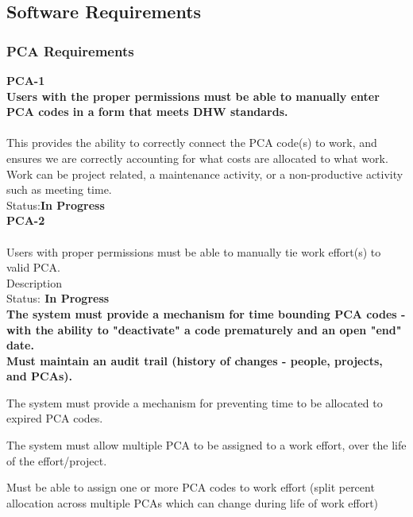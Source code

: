 \subsection{Software Requirements}

\subsubsection{PCA Requirements}

\bf{PCA-1} \\
Users with the proper permissions must be able to manually enter PCA codes in a form that meets DHW standards.\\
\paragraph{}
This provides the ability to correctly connect the PCA code(s) to work, and ensures we are correctly accounting for what costs are allocated to what work. Work can be project related, a maintenance activity, or a non-productive activity such as meeting time.\\
Status:\bfseries{In Progress}\\

\bfseries{PCA-2}\\
\paragraph{}
Users with proper permissions must be able to manually tie work effort(s) to valid PCA.\\
Description\\
Status:\bfseries{ In Progress}\\

The system must provide a mechanism for time bounding PCA codes - with the ability to "deactivate" a code prematurely and an open "end" date.\\

Must maintain an audit trail (history of changes - people, projects, and PCAs).

The system must provide a mechanism for preventing time to be allocated to expired PCA codes.

The system must allow multiple PCA to be assigned to a work effort, over the life of the effort/project.

Must be able to assign one or more PCA codes to work effort (split percent allocation across multiple PCAs which can change during life of work effort)

